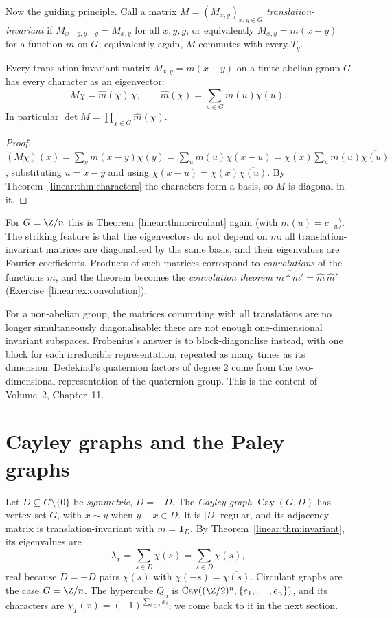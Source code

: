 Now the guiding principle. Call a matrix $M=(M_{x,y})_{x,y\in G}$ \emph{translation-invariant} if $M_{x+g,y+g}=M_{x,y}$ for all
$x,y,g$, or equivalently $M_{x,y}=m(x-y)$ for a function $m$ on $G$; equivalently again, $M$ commutes with every $T_g$.

\begin{theorem}\label{linear:thm:invariant}
Every translation-invariant matrix $M_{x,y}=m(x-y)$ on a finite abelian group $G$ has every character as an eigenvector:
\[
M\chi=\hat m(\chi)\,\chi,\qquad\hat m(\chi)=\sum_{u\in G}m(u)\overline{\chi(u)}.
\]
In particular $\det M=\prod_{\chi\in\widehat G}\hat m(\chi)$.
\end{theorem}
\begin{proof}
$(M\chi)(x)=\sum_ym(x-y)\chi(y)=\sum_um(u)\chi(x-u)=\chi(x)\sum_um(u)\overline{\chi(u)}$, substituting $u=x-y$ and using
$\chi(x-u)=\chi(x)\overline{\chi(u)}$. By Theorem~\ref{linear:thm:characters} the characters form a basis, so $M$ is diagonal in it.
\end{proof}

For $G=\Z/n$ this is Theorem~\ref{linear:thm:circulant} again (with $m(u)=c_{-u}$). The striking feature is that the eigenvectors do not
depend on $m$: all translation-invariant matrices are diagonalised by the same basis, and their eigenvalues are Fourier
coefficients. Products of such matrices correspond to \emph{convolutions} of the functions $m$, and the theorem becomes the
\emph{convolution theorem} $\widehat{m*m'}=\hat m\,\hat m'$ (Exercise~\ref{linear:ex:convolution}).

\begin{remark}
For a non-abelian group, the matrices commuting with all translations are no longer simultaneously diagonalisable: there are not
enough one-dimensional invariant subspaces. Frobenius's answer is to block-diagonalise instead, with one block for each
irreducible representation, repeated as many times as its dimension. Dedekind's quaternion factors of degree $2$ come from the
two-dimensional representation of the quaternion group. This is the content of Volume~2, Chapter~11.
\end{remark}

\section{Cayley graphs and the Paley graphs}

Let $D\subseteq G\setminus\{0\}$ be \emph{symmetric}, $D=-D$. The \emph{Cayley graph} $\operatorname{Cay}(G,D)$ has vertex set $G$,
with $x\sim y$ when $y-x\in D$. It is $|D|$-regular, and its adjacency matrix is translation-invariant with $m=\mathbf 1_D$. By
Theorem~\ref{linear:thm:invariant}, its eigenvalues are
\[
\lambda_\chi=\sum_{s\in D}\overline{\chi(s)}=\sum_{s\in D}\chi(s),
\]
real because $D=-D$ pairs $\chi(s)$ with $\chi(-s)=\overline{\chi(s)}$. Circulant graphs are the case $G=\Z/n$. The hypercube
$Q_n$ is $\operatorname{Cay}((\Z/2)^n,\{e_1,\dots,e_n\})$, and its characters are $\chi_T(x)=(-1)^{\sum_{i\in T}x_i}$; we come back to
it in the next section.

